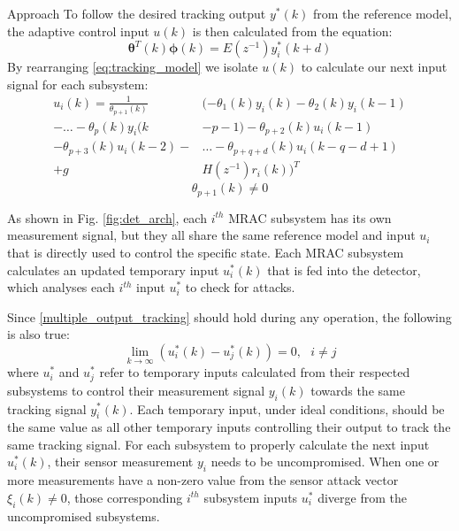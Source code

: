 \begin{section}{Approach}
To follow the desired tracking output $y^*(k)$ from the reference model, the adaptive control input $u(k)$ is then calculated from the equation:
    \begin{equation}
    \label{eq:tracking_model}
	\bm{\theta}^T(k)\bm{\phi}(k)=E(z^{-1})y_i^*(k+d)
	\end{equation}
By rearranging \eqref{eq:tracking_model} we isolate $u(k)$ to calculate our next input signal for each subsystem:
	\begin{align}
	\label{eq:End}
	u_i(k)=\frac{1}{\theta_{p+1}(k)}&(-\theta_1(k)y_i(k)-\theta_2(k)y_i(k-1)  \nonumber \\
    -\dots-\theta_p(k)y_i(k&-p-1)-\theta_{p+2}(k)u_i(k-1)  \\
	-\theta_{p+3}(k)u_i(k-2)-& \dots - \theta_{p+q+d}(k)u_i(k-q-d+1) \nonumber \\
	+g&H(z^{-1})r_i(k))^T \nonumber
	\end{align}
    \begin{equation}
	\theta_{p+1}(k)\neq0 \nonumber
	\end{equation}





	
As shown in Fig. \ref{fig:det_arch}, each $i^{th}$ MRAC subsystem has its own measurement signal, but they all share the same reference model and input $u_i$ that is directly used to control the specific state. Each MRAC subsystem calculates an updated temporary input $u^*_i(k)$ that is fed into the detector, which analyses each $i^{th}$ input $u^*_i$ to check for attacks.

Since \eqref{multiple_output_tracking} should hold during any operation, the following is also true:
\begin{equation}
    \label{eq:u_to_0}
    \lim_{k\to\infty}(u^*_i(k)-u^*_j(k))=0, \text{ }i\neq j
\end{equation}
where $u^*_i$ and $u^*_j$ refer to temporary inputs calculated from their respected subsystems to control their measurement signal $y_i(k)$ towards the same tracking signal $y_i^*(k)$. Each temporary input, under ideal conditions, should be the same value as all other temporary inputs controlling their output to track the same tracking signal. For each subsystem to properly calculate the next input $u^*_i(k)$, their sensor measurement $y_i$ needs to be uncompromised. When one or more measurements have a non-zero value from the sensor attack vector $\xi_i(k) \neq 0$, those corresponding $i^{th}$ subsystem inputs $u^*_i$ diverge from the uncompromised subsystems.


\end{section}
